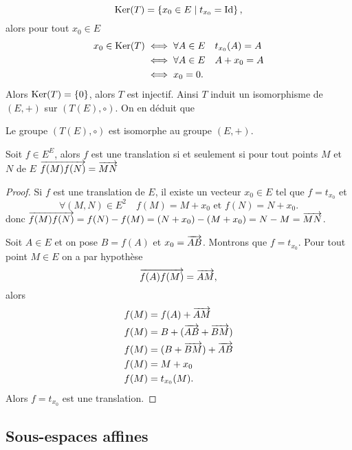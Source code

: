 \begin{equation}
  \operatorname{Ker}(T)= \left\{x_0 \in E\mathrel{}\middle|\mathrel{}t_{x_0} = \operatorname{Id}\right\},
\end{equation}
alors pour tout \(x_0 \in E\)
\begin{align}
  x_0 \in \operatorname{Ker}(T) &\iff \forall A \in E \quad t_{x_0}(A)=A\\
                  &\iff \forall A \in E \quad A+x_0=A \\
                  &\iff x_0=0.
\end{align}
Alors \(\operatorname{Ker}(T)=\{0\}\), alors \(T\) est injectif. Ainsi \(T\) induit un isomorphisme de \((E,+)\) sur \((T(E),\circ)\). On en déduit que
\begin{prop}
  Le groupe \((T(E),\circ)\) est isomorphe au groupe \((E,+)\).
\end{prop}
%
\begin{theo}
  Soit \(f \in E^E\), alors \(f\) est une translation si et seulement si pour tout points \(M\) et \(N\) de \(E\) \(\overrightarrow{f(M)f(N)}=\overrightarrow{MN}\)
\end{theo}
\begin{proof}
  Si \(f\) est une translation de \(E\), il existe un vecteur \(x_0 \in E\) tel que \(f=t_{x_0}\) et
  \begin{equation}
    \forall (M, N) \in E^2 \quad f(M)=M+x_0 \text{~et~} f(N)=N+x_0.
  \end{equation}
  donc \(\overrightarrow{f(M)f(N)}=f(N)-f(M)=(N+x_0)-(M+x_0)=N-M=\overrightarrow{MN}\).

  Soit \(A \in E\) et on pose \(B=f(A)\) et \(x_0=\overrightarrow{AB}\). Montrons que \(f=t_{x_0}\). Pour tout point \(M \in E\) on a par hypothèse
  \begin{equation}
    \overrightarrow{f(A)f(M)}=\overrightarrow{AM},
  \end{equation}
  alors
  \begin{align}
    f(M)&=f(A)+\overrightarrow{AM} \\
    f(M)&=B+(\overrightarrow{AB}+\overrightarrow{BM}) \\
    f(M)&=(B+\overrightarrow{BM})+\overrightarrow{AB} \\
    f(M)&=M+x_0\\
    f(M)&=t_{x_0}(M).
  \end{align}
  Alors \(f=t_{x_0}\) est une translation.
\end{proof}

\subsection{Sous-espaces affines}

